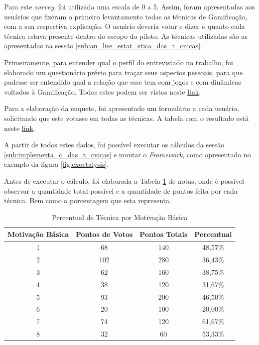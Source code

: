 Para este \textit{survey}, foi utilizada uma escala de 0 a 5. Assim, foram apresentadas aos usuários
que fizeram o primeiro levantamento todas as técnicas de Gamificação, com a sua
respectiva explicação. O usuário deveria votar e dizer o quanto cada técnica estava presente
dentro do escopo do piloto. As técnicas utilizadas são as apresentadas na sessão
\ref{sub:an_lise_estat_stica_das_t_cnicas}.

Primeiramente, para entender qual o perfil do entrevistado no trabalho, foi elaborado
um questionário prévio para traçar seus aspectos pessoais,
para que pudesse ser entendido qual a relação que esse tem com jogos e com dinâmicas
voltados à Gamificação. Todos estes podem ser vistos neste \href{https://docs.google.com/spreadsheets/d/1galTU00NPQKaU7GRsYOciLhD0ZzIKH9BbJWyRdC3gbs/edit?usp=sharing}{link}.

Para a elaboração da enquete, foi apresentado um formulário a cada usuário, solicitando
que este votasse em todas as técnicas. A tabela com o resultado está neste
\href{https://docs.google.com/spreadsheets/d/1qROpsDaz32PZtkvCvmFTrqLVLgqhHR9F-Q5rcQ_pwys/edit?usp=sharing}{link}.

A partir de todos estes dados, foi possível executar os cálculos da sessão \ref{sub:implementa_o_das_t_cnicas}
e montar o \textit{Framework}, como apresentado no exemplo da figura \ref{fig:exoctalysis}.

Antes de executar o cálculo, foi elaborada a Tabela \ref{tab:percentual_tecnica_motivacao}
 de notas, onde é possível
observar a quantidade total possível e a quantidade de pontos feita por cada técnica.
Bem como a porcentagem que esta representa.

\begin{table}[]
    \centering
    \caption{Percentual de Técnica por Motivação Básica}
    \label{tab:percentual_tecnica_motivacao}
    \begin{tabular}{@{}cccc@{}}
        \toprule
        Motivação Básica & Pontos de Votos & Pontos Totais & Percentual \\ \midrule
        1         & 68            & 140             & 48,57\%    \\
        2         & 102           & 280             & 36,43\%    \\
        3         & 62            & 160             & 38,75\%    \\
        4         & 38            & 120             & 31,67\%    \\
        5         & 93            & 200             & 46,50\%    \\
        6         & 20            & 100             & 20,00\%    \\
        7         & 74            & 120             & 61,67\%    \\
        8         & 32            & 60              & 53,33\%    \\ \bottomrule
    \end{tabular}
\end{table}

